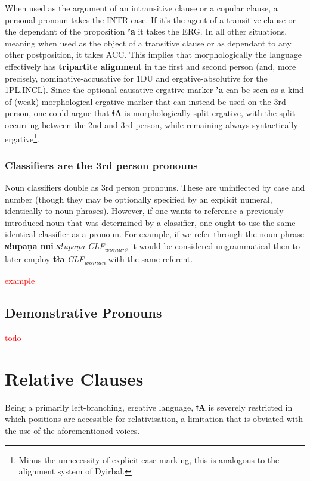 \documentclass[11pt,a5paper]{book}
\newcommand{\qcn}[1]{\textcolor{AccentText}{\large\textbf{#1}}}
\newcommand{\langname}{\qcn{ǂA}}
\newcommand{\transl}[2]{\qcn{#1} \emph{#2}}
\newcommand{\grammsc}[1]{\textsc{#1}}
\newcommand{\CLF}[1]{\grammsc{CLF}\textsubscript{#1}}
\newcommand{\ERG}{\grammsc{ERG}}
\newcommand{\ACC}{\grammsc{ACC}}
\newcommand{\INTR}{\grammsc{INTR}}
\newcommand{\cmnt}[1]{\textcolor{red}{#1}}
\begin{document}
When used as the argument of an intransitive clause or a copular clause, a personal pronoun takes the \INTR{} case. If it's the agent of a transitive clause or the dependant of the proposition \qcn{ʼa} it takes the \ERG{}. In all other situations, meaning when used as the object of a transitive clause or as dependant to any other postposition, it takes \ACC{}. This implies that morphologically the language effectively has \textbf{tripartite alignment} in the first and second person (and, more precisely, nominative-accusative for 1DU and ergative-absolutive for the 1PL.INCL). Since the optional causative-ergative marker \qcn{ʼa} can be seen as a kind of (weak) morphological ergative marker that can instead be used on the 3rd person, one could argue that \langname{} is morphologically split-ergative, with the split occurring between the 2nd and 3rd person, while remaining always syntactically ergative\footnote{Minus the unnecessity of explicit case-marking, this is analogous to the alignment system of Dyirbal.}.

\subsubsection{Classifiers are the 3rd person pronouns}

Noun classifiers double as 3rd person pronouns. These are uninflected by case and number (though they may be optionally specified by an explicit numeral, identically to noun phrases). However, if one wants to reference a previously introduced noun that was determined by a classifier, one ought to use the same identical classifier as a pronoun. For example, if we refer through the noun phrase \transl{ɴǃupaṇa nui}{ɴǃupaṇa \CLF{woman}}, it would be considered ungrammatical then to later employ \transl{tła}{\CLF{woman}} with the same referent.

\cmnt{example}

\subsection{Demonstrative Pronouns}

\cmnt{todo}

\section{Relative Clauses}\label{sec:relative}

Being a primarily left-branching, ergative language, \langname{} is severely restricted in which positions are accessible for relativisation, a limitation that is obviated with the use of the aforementioned voices.
\end{document}
